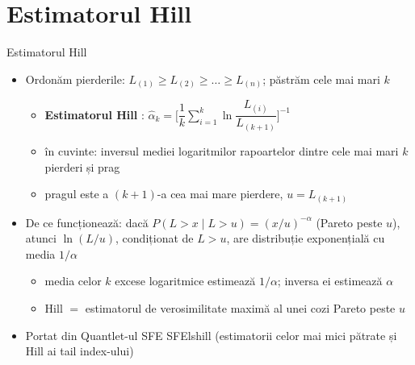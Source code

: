\section{Estimatorul Hill}

\begin{frame}{Estimatorul Hill}
\itemsize{\small}
\begin{itemize}
    \item Ordonăm pierderile: $L_{(1)} \ge L_{(2)} \ge \dots \ge L_{(n)}$; păstrăm cele mai mari $k$
    \begin{itemize}
        \item \textbf{Estimatorul Hill} : $\hat\alpha_k = \Big[\dfrac{1}{k}\sum_{i=1}^{k}\ln\dfrac{L_{(i)}}{L_{(k+1)}}\Big]^{-1}$
        \item în cuvinte: inversul mediei logaritmilor rapoartelor dintre cele mai mari $k$ pierderi și prag
        \item pragul este a $(k+1)$-a cea mai mare pierdere, $u = L_{(k+1)}$
    \end{itemize}
    \item De ce funcționează: dacă $P(L > x \mid L > u) = (x/u)^{-\alpha}$ (Pareto peste $u$), atunci $\ln(L/u)$, condiționat de $L > u$, are distribuție exponențială cu media $1/\alpha$
    \begin{itemize}
        \item media celor $k$ excese logaritmice estimează $1/\alpha$; inversa ei estimează $\alpha$
        \item Hill $=$ estimatorul de verosimilitate maximă al unei cozi Pareto peste $u$
    \end{itemize}
    \item Portat din Quantlet-ul SFE SFElshill (estimatorii celor mai mici pătrate și Hill ai tail index-ului) 
\end{itemize}
\end{frame}

